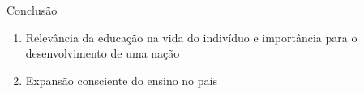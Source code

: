 \documentclass{beamer}
\begin{document}
\begin{frame}{Conclusão}
	\begin{enumerate}
	\item Relevância da educação na vida do indivíduo e importância para o desenvolvimento de uma nação

	\item Expansão consciente do ensino no país
	\end{enumerate}
\end{frame}
\end{document}
